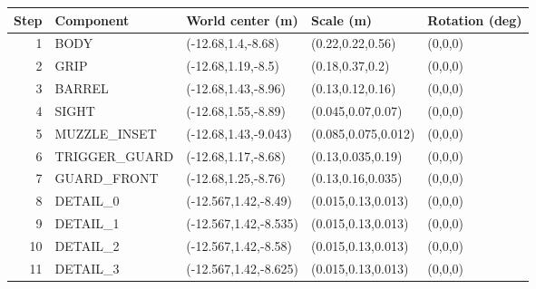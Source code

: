 \begin{center}\scriptsize\begin{tabular}{rllll}\toprule
Step & Component & World center (m) & Scale (m) & Rotation (deg) \\\midrule
1 & BODY & (-12.68,1.4,-8.68) & (0.22,0.22,0.56) & (0,0,0) \\
2 & GRIP & (-12.68,1.19,-8.5) & (0.18,0.37,0.2) & (0,0,0) \\
3 & BARREL & (-12.68,1.43,-8.96) & (0.13,0.12,0.16) & (0,0,0) \\
4 & SIGHT & (-12.68,1.55,-8.89) & (0.045,0.07,0.07) & (0,0,0) \\
5 & MUZZLE\_INSET & (-12.68,1.43,-9.043) & (0.085,0.075,0.012) & (0,0,0) \\
6 & TRIGGER\_GUARD & (-12.68,1.17,-8.68) & (0.13,0.035,0.19) & (0,0,0) \\
7 & GUARD\_FRONT & (-12.68,1.25,-8.76) & (0.13,0.16,0.035) & (0,0,0) \\
8 & DETAIL\_0 & (-12.567,1.42,-8.49) & (0.015,0.13,0.013) & (0,0,0) \\
9 & DETAIL\_1 & (-12.567,1.42,-8.535) & (0.015,0.13,0.013) & (0,0,0) \\
10 & DETAIL\_2 & (-12.567,1.42,-8.58) & (0.015,0.13,0.013) & (0,0,0) \\
11 & DETAIL\_3 & (-12.567,1.42,-8.625) & (0.015,0.13,0.013) & (0,0,0) \\
\bottomrule\end{tabular}\end{center}
